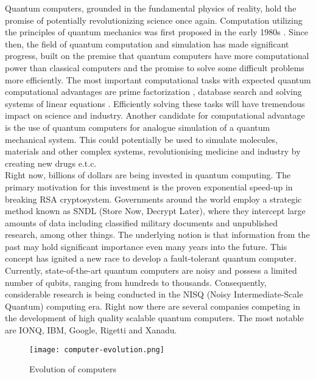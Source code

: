 \documentclass[12pt,a4paper]{report}
\begin{document}
\noindent
Quantum computers, grounded in the fundamental physics of reality, hold the promise of potentially revolutionizing science once again. Computation utilizing the principles of quantum mechanics was first proposed in the early 1980s \cite{Feynman1982, Feynman1986, Benioff1980}. Since then, the field of quantum computation and simulation has made significant progress, built on the premise that quantum computers have more computational power than classical computers and the promise to solve some difficult problems more efficiently. The most important computational tasks with expected quantum computational advantages are prime factorization \cite{Shors_factorization}, database search \cite{Grover_1, Grover_2} and solving systems of linear equations \cite{HHL}. Efficiently solving these tasks will have tremendous impact on science and industry. Another candidate for computational advantage is the use of quantum computers for analogue simulation of a quantum mechanical system. This could potentially be used to simulate molecules, materials and other complex systems, revolutionising medicine and industry by creating new drugs e.t.c.
\\

\noindent
Right now, billions of dollars are being invested in quantum computing. The primary motivation for this investment is the proven exponential speed-up in breaking RSA \cite{RSA} cryptosystem. Governments around the world employ a strategic method known as SNDL (Store Now, Decrypt Later), where they intercept large amounts of data including classified military documents and unpublished research, among other things. The underlying notion is that information from the past may hold significant importance even many years into the future. This concept has ignited a new race to develop a fault-tolerant quantum computer. Currently, state-of-the-art quantum computers are noisy and possess a limited number of qubits, ranging from hundreds to thousands. Consequently, considerable research is being conducted in the NISQ (Noisy Intermediate-Scale Quantum) computing era. Right now there are several companies competing in the development of high quality scalable quantum computers. The most notable are IONQ, IBM, Google, Rigetti and Xanadu. 

\newpage

\begin{figure}[h]
  \centering
  \texttt{[image: computer-evolution.png]}
  \caption{Evolution of computers}
\end{figure}
\end{document}
